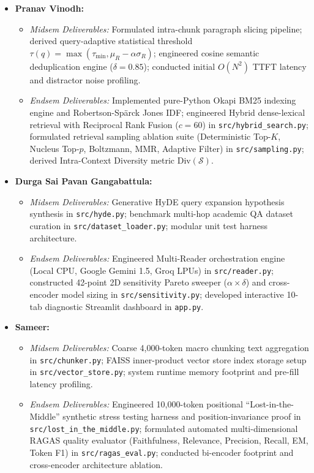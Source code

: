 \documentclass[lettersize,journal]{IEEEtran}
\begin{document}
\begin{itemize}
    \item \textbf{Pranav Vinodh:}
    \begin{itemize}
        \item \textit{Midsem Deliverables:} Formulated intra-chunk paragraph slicing pipeline; derived query-adaptive statistical threshold $\tau(q) = \max(\tau_{\min}, \mu_R - \alpha \sigma_R)$; engineered cosine semantic deduplication engine ($\delta = 0.85$); conducted initial $O(N^2)$ TTFT latency and distractor noise profiling.
        \item \textit{Endsem Deliverables:} Implemented pure-Python Okapi BM25 indexing engine and Robertson-Spärck Jones IDF; engineered Hybrid dense-lexical retrieval with Reciprocal Rank Fusion ($c=60$) in \texttt{src/hybrid\_search.py}; formulated retrieval sampling ablation suite (Deterministic Top-$K$, Nucleus Top-$p$, Boltzmann, MMR, Adaptive Filter) in \texttt{src/sampling.py}; derived Intra-Context Diversity metric $\text{Div}(\mathcal{S})$.
    \end{itemize}
    \item \textbf{Durga Sai Pavan Gangabattula:}
    \begin{itemize}
        \item \textit{Midsem Deliverables:} Generative HyDE query expansion hypothesis synthesis in \texttt{src/hyde.py}; benchmark multi-hop academic QA dataset curation in \texttt{src/dataset\_loader.py}; modular unit test harness architecture.
        \item \textit{Endsem Deliverables:} Engineered Multi-Reader orchestration engine (Local CPU, Google Gemini 1.5, Groq LPUs) in \texttt{src/reader.py}; constructed 42-point 2D sensitivity Pareto sweeper ($\alpha \times \delta$) and cross-encoder model sizing in \texttt{src/sensitivity.py}; developed interactive 10-tab diagnostic Streamlit dashboard in \texttt{app.py}.
    \end{itemize}
    \item \textbf{Sameer:}
    \begin{itemize}
        \item \textit{Midsem Deliverables:} Coarse 4,000-token macro chunking text aggregation in \texttt{src/chunker.py}; FAISS inner-product vector store index storage setup in \texttt{src/vector\_store.py}; system runtime memory footprint and pre-fill latency profiling.
        \item \textit{Endsem Deliverables:} Engineered 10,000-token positional ``Lost-in-the-Middle'' synthetic stress testing harness and position-invariance proof in \texttt{src/lost\_in\_the\_middle.py}; formulated automated multi-dimensional RAGAS quality evaluator (Faithfulness, Relevance, Precision, Recall, EM, Token F1) in \texttt{src/ragas\_eval.py}; conducted bi-encoder footprint and cross-encoder architecture ablation.
    \end{itemize}
\end{itemize}
\end{document}
